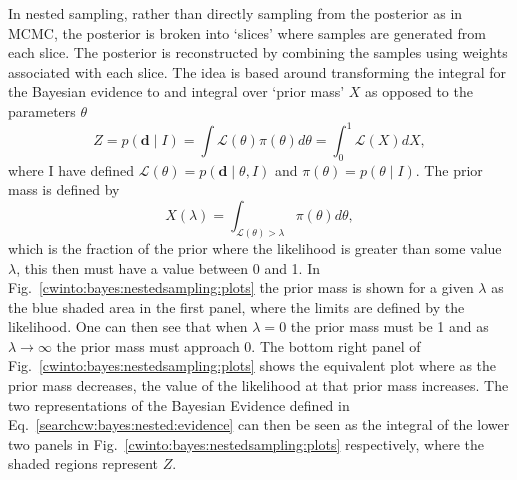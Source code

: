 In nested sampling, rather than directly sampling from the posterior as in \gls{MCMC}, the posterior is broken into `slices' where samples are generated from each slice.
The posterior is reconstructed by combining the samples using weights associated with each slice.
The idea is based around transforming the integral for the Bayesian evidence to and integral over `prior mass' $X$ as opposed to the parameters $\theta$
\begin{equation}
\label{searchcw:bayes:nested:evidence}
	Z = p(\bm{d} \mid I) = \int \mathcal{L}(\theta) \pi(\theta) d\theta = \int_0^1 \mathcal{L}(X) dX,
\end{equation}
where I have defined $\mathcal{L}(\theta) = p(\bm{d} \mid \theta, I)$ and $\pi(\theta) = p(\theta \mid I)$.
The prior mass is defined by
\begin{equation}
\label{searchcw:bayes:nested:priormass}
	X(\lambda) = \int_{\mathcal{L}(\theta) > \lambda} \pi(\theta) d\theta,
\end{equation}
which is the fraction of the prior where the likelihood is greater than some value $\lambda$, this then must have a value between 0 and 1.
In Fig.~\ref{cwinto:bayes:nestedsampling:plots} the prior mass is shown for a given $\lambda$ as the blue shaded area in the first panel, where the limits are defined by the likelihood.
One can then see that when $\lambda= 0$ the prior mass must be 1 and as $\lambda \rightarrow \infty$ the prior mass must approach 0. The bottom right panel of Fig.~\ref{cwinto:bayes:nestedsampling:plots} shows the equivalent plot where as the prior mass decreases, the value of the likelihood at that prior mass increases.
The two representations of the Bayesian Evidence defined in Eq.~\ref{searchcw:bayes:nested:evidence} can then be seen as the integral of the lower two panels in Fig.~\ref{cwinto:bayes:nestedsampling:plots} respectively, where the shaded regions represent $Z$.
%
